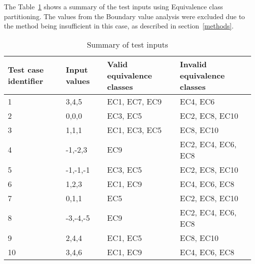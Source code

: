 \newpage

\noindent The Table~\ref{testinputtable} shows a summary of the test inputs using Equivalence class partitioning. The values from the Boundary value analysis were excluded due to the method being insufficient in this case, as described in section~\ref{methods}. 

\begin{table}[!htb]
	\centering
	\caption{Summary of test inputs}
	\label{testinputtable}

    \begin{tabular}{|l|l|l|l|}
        \hline
        Test case identifier & Input values & Valid equivalence classes      & Invalid equivalence classes         \\ \hline
        1                    & 3,4,5        & EC1, EC7, EC9 & EC4, EC6           \\ 
        2                    & 0,0,0        & EC3, EC5      & EC2, EC8, EC10     \\ 
        3                    & 1,1,1        & EC1, EC3, EC5 & EC8, EC10          \\ 
        4                    & -1,-2,3      & EC9           & EC2, EC4, EC6, EC8 \\ 
        5                    & -1,-1,-1     & EC3, EC5      & EC2, EC8, EC10     \\ 
        6                    & 1,2,3        & EC1, EC9      & EC4, EC6, EC8      \\ 
        7                    & 0,1,1        & EC5           & EC2, EC8, EC10     \\ 
        8                    & -3,-4,-5     & EC9           & EC2, EC4, EC6, EC8 \\ 
        9                    & 2,4,4        & EC1, EC5      & EC8, EC10          \\ 
        10                   & 3,4,6        & EC1, EC9      & EC4, EC6, EC8      \\
        \hline
    \end{tabular}
\end{table}






